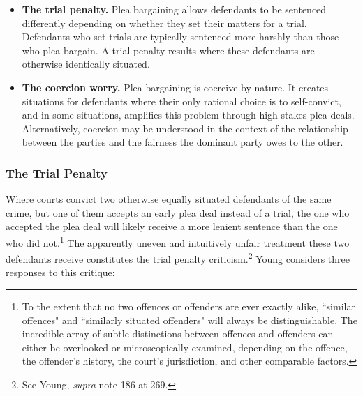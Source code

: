 \begin{itemize}
    \item \textbf{The trial penalty.} Plea bargaining allows defendants to be sentenced differently depending on whether they set their matters for a trial. Defendants who set trials are typically sentenced more harshly than those who plea bargain. A trial penalty results where these defendants are otherwise identically situated.
    \item \textbf{The coercion worry.} Plea bargaining is coercive by nature. It creates situations for defendants where their only rational choice is to self-convict, and in some situations, amplifies this problem through high-stakes plea deals. Alternatively, coercion may be understood in the context of the relationship between the parties and the fairness the dominant party owes to the other.
\end{itemize}

\subsubsection{The Trial Penalty}

Where courts convict two otherwise equally situated defendants of the same crime, but one of them accepts an early plea deal instead of a trial, the one who accepted the plea deal will likely receive a more lenient sentence than the one who did not.\footnote{To the extent that no two offences or offenders are ever exactly alike, ``similar offences" and ``similarly situated offenders" will always be distinguishable. The incredible array of subtle distinctions between offences and offenders can either be overlooked or microscopically examined, depending on the offence, the offender's history, the court's jurisdiction, and other comparable factors.} The apparently uneven and intuitively unfair treatment these two defendants receive constitutes the trial penalty criticism.\footnote{See Young, \textit{supra} note 186 at 269.} Young considers three responses to this critique:

